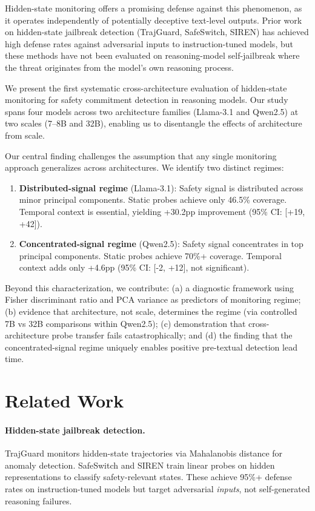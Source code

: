 \documentclass[11pt]{article}
\begin{document}
Hidden-state monitoring offers a promising defense against this phenomenon, as it operates independently of potentially deceptive text-level outputs. Prior work on hidden-state jailbreak detection (TrajGuard, SafeSwitch, SIREN) has achieved high defense rates against adversarial inputs to instruction-tuned models, but these methods have not been evaluated on reasoning-model self-jailbreak where the threat originates from the model's own reasoning process.

We present the first systematic cross-architecture evaluation of hidden-state monitoring for safety commitment detection in reasoning models. Our study spans four models across two architecture families (Llama-3.1 and Qwen2.5) at two scales (7--8B and 32B), enabling us to disentangle the effects of architecture from scale.

Our central finding challenges the assumption that any single monitoring approach generalizes across architectures. We identify two distinct regimes:

\begin{enumerate}
    \item \textbf{Distributed-signal regime} (Llama-3.1): Safety signal is distributed across minor principal components. Static probes achieve only 46.5\% coverage. Temporal context is essential, yielding +30.2pp improvement (95\% CI: [+19, +42]).
    \item \textbf{Concentrated-signal regime} (Qwen2.5): Safety signal concentrates in top principal components. Static probes achieve 70\%+ coverage. Temporal context adds only +4.6pp (95\% CI: [-2, +12], not significant).
\end{enumerate}

Beyond this characterization, we contribute: (a) a diagnostic framework using Fisher discriminant ratio and PCA variance as predictors of monitoring regime; (b) evidence that architecture, not scale, determines the regime (via controlled 7B vs 32B comparisons within Qwen2.5); (c) demonstration that cross-architecture probe transfer fails catastrophically; and (d) the finding that the concentrated-signal regime uniquely enables positive pre-textual detection lead time.

\section{Related Work}

\paragraph{Hidden-state jailbreak detection.} TrajGuard monitors hidden-state trajectories via Mahalanobis distance for anomaly detection. SafeSwitch and SIREN train linear probes on hidden representations to classify safety-relevant states. These achieve 95\%+ defense rates on instruction-tuned models but target adversarial \emph{inputs}, not self-generated reasoning failures.
\end{document}
